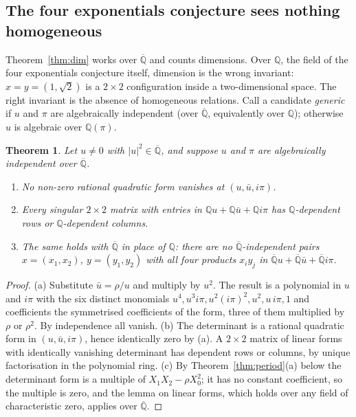 \documentclass[11pt,a4paper]{article}
\theoremstyle{plain}
\newtheorem{theorem}{Theorem}[section]
\theoremstyle{definition}
\newcommand{\Q}{\mathbb{Q}}
\newcommand{\Alg}{\overline{\mathbb{Q}}}
\begin{document}
\subsection*{The four exponentials conjecture sees nothing homogeneous}

Theorem~\ref{thm:dim} works over $\Alg$ and counts dimensions. Over $\Q$, the field of the
four exponentials conjecture itself, dimension is the wrong invariant: $x=y=(1,\sqrt2)$ is a
$2\times2$ configuration inside a two-dimensional space. The right invariant is the absence of
homogeneous relations. Call a candidate \emph{generic} if $u$ and $\pi$ are algebraically
independent (over $\Alg$, equivalently over $\Q$); otherwise $u$ is algebraic over $\Q(\pi)$.

\begin{theorem}\label{thm:homog}
Let $u\neq0$ with $|u|^{2}\in\Alg$, and suppose $u$ and $\pi$ are algebraically independent over
$\Alg$.
\begin{enumerate}[label=\textup{(\alph*)}]
  \item No non-zero rational quadratic form vanishes at $(u,\bar u,i\pi)$.
  \item Every singular $2\times2$ matrix with entries in $\Q u+\Q\bar u+\Q i\pi$ has
        $\Q$-dependent rows or $\Q$-dependent columns.
  \item The same holds with $\Alg$ in place of $\Q$: there are no $\Alg$-independent pairs
        $x=(x_{1},x_{2})$, $y=(y_{1},y_{2})$ with all four products $x_{i}y_{j}$ in
        $\Alg u+\Alg\bar u+\Alg i\pi$.
\end{enumerate}
\end{theorem}

\begin{proof}
(a) Substitute $\bar u=\rho/u$ and multiply by $u^{2}$. The result is a polynomial in $u$ and $i\pi$
with the six distinct monomials $u^{4},u^{3}i\pi,u^{2}(i\pi)^{2},u^{2},u\,i\pi,1$ and coefficients
the symmetrised coefficients of the form, three of them multiplied by $\rho$ or $\rho^{2}$. By
independence all vanish. (b) The determinant is a rational quadratic form in $(u,\bar u,i\pi)$,
hence identically zero by (a). A $2\times2$ matrix of linear forms with identically vanishing
determinant has dependent rows or columns, by unique factorisation in the polynomial ring.
(c) By Theorem~\ref{thm:period}(a) below the determinant form is a multiple of
$X_{1}X_{2}-\rho X_{0}^{2}$; it has no constant coefficient, so the multiple is zero, and the
lemma on linear forms, which holds over any field of characteristic zero, applies over $\Alg$.
\end{proof}
\end{document}
